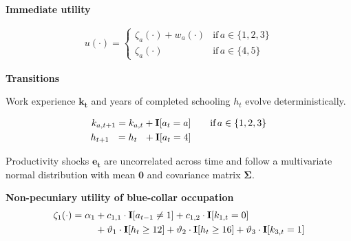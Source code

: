 %
\begin{frame}\textbf{Immediate utility}\vspace{0.3cm}

  \begin{align*}
  u(\cdot) =
  \begin{cases}
      \zeta_a(\cdot)  + w_a(\cdot)                & \text{if}\, a \in \{1, 2, 3\}  \\
      \zeta_a(\cdot)                                                  &  \text{if}\, a \in \{4, 5\}
  \end{cases}
  \end{align*}

\end{frame}
\begin{frame}\textbf{Transitions}\vspace{0.3cm}

  Work experience $\bm{k_t}$  and years of completed schooling $h_t$ evolve deterministically.

  \begin{align*}
  k_{a,t+1} = k_{a,t} + {\textbf{I}}[a_t = a]  &\qquad \text{if}\, a \in \{1, 2, 3\} \\
  h_{t + 1\phantom{,a}} = h_{t\phantom{,a}} +   {\textbf{I}}[a_t = 4]  &\qquad\\
  \end{align*}

  Productivity shocks $\bm{e_t}$ are uncorrelated across time and follow a multivariate normal distribution with mean $\bm{0}$ and covariance matrix $\bm{\Sigma}$.

\end{frame}
\begin{frame}\textbf{Non-pecuniary utility of blue-collar occupation}\vspace{0.3cm}
%
  \begin{align*}
  \zeta_{1}(\cdot)  = \alpha_1 & + c_{1,1} \cdot {\textbf{I}}[a_{t-1} \neq 1] + c_{1,2} \cdot {\textbf{I}}[k_{1,t} = 0] \\
                              & + \vartheta_1 \cdot {\textbf{I}}[h_t \geq 12] + \vartheta_2 \cdot {\textbf{I}}[h_t \geq 16] + \vartheta_3 \cdot {\textbf{I}}[k_{3,t} = 1]
  \end{align*}
\end{frame}

